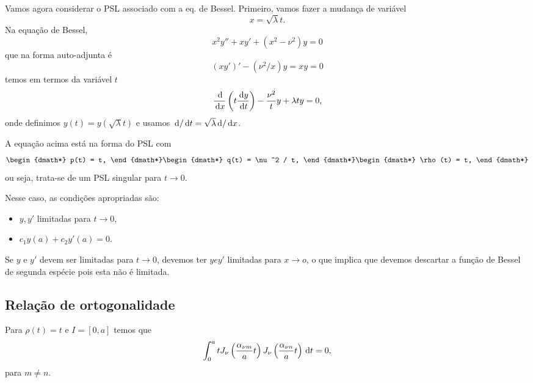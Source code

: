Vamos agora considerar o PSL associado com a eq. de Bessel. Primeiro, vamos
fazer a mudança de variável
\begin{dmath*}
  x = \sqrt{\lambda} t.
\end{dmath*}
Na equação de Bessel,
\begin{dmath*}
  x^2 y'' + x y' + \left( x^2 - \nu^2 \right) y = 0
\end{dmath*}
que na forma auto-adjunta é
\begin{dmath*}
  \left( x y' \right)' - \left( \nu^2 / x \right) y = x y = 0
\end{dmath*}
temos em termos da variável $t$
\begin{dmath*}
  \frac{\id{}}{\id{x}}\left( t \frac{\id{y}}{\id{t}} \right) - \frac{\nu^2}{t} y
  + \lambda t y = 0,
\end{dmath*}
onde definimos $y(t) = y(\sqrt{\lambda} t)$ e usamos $\, \mathrm{d} / \, \mathrm{d}t =
\sqrt{\lambda} \, \mathrm{d} / \, \mathrm{d}x$.

A equação acima está na forma do PSL com
\begin{dgroup*}
  \begin{dmath*}
    p(t) = t,
  \end{dmath*}
  \begin{dmath*}
    q(t) = \nu^2 / t,
  \end{dmath*}
  \begin{dmath*}
    \rho(t) = t,
  \end{dmath*}
\end{dgroup*}
ou seja, trata-se de um PSL singular para $t \to 0$.

Nesse caso, as condições apropriadas são:
\begin{itemize}
  \item $y, y'$ limitadas para $t \to 0$,
  \item $c_1 y(a) + c_2 y'(a) = 0$.
\end{itemize}

\begin{obs}
  Se $y$ e $y'$ devem ser limitadas para $t \to 0$, devemos ter $y e y'$
  limitadas para $x \to o$, o que implica que devemos descartar a função de
  Bessel de segunda espécie pois esta não é limitada.
\end{obs}


\subsection{Relação de ortogonalidade}
Para $\rho(t) = t$ e $I = [0,a]$ temos que
\begin{dmath*}
  \int_0^a t J_\nu\left( \frac{\alpha_{\nu m}}{a} t \right) J_\nu\left(
  \frac{\alpha_{\nu n}}{a} t \right) \id{t} = 0,
\end{dmath*}
para $m \neq n$.

